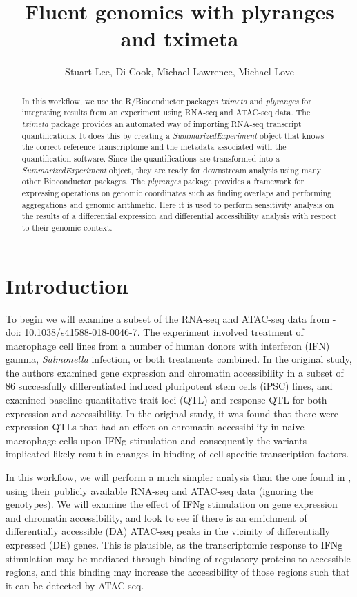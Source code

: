 \documentclass[
  9pt,
  a4paper,
]{extarticle}
\title{Fluent genomics with plyranges and tximeta}
\author{Stuart Lee, Di Cook, Michael Lawrence, Michael Love}
\date{}
\begin{document}
\maketitle
\begin{abstract}
In this workflow, we use the R/Bioconductor packages \emph{tximeta} and \emph{plyranges} for integrating results from an experiment using RNA-seq and ATAC-seq data. The \emph{tximeta} package provides an automated way of importing RNA-seq transcript quantifications. It does this by creating a \emph{SummarizedExperiment} object that knows the correct reference transcriptome and the metadata associated with the quantification software. Since the quantifications are transformed into a \emph{SummarizedExperiment} object, they are ready for downstream analysis using many other Bioconductor packages. The \emph{plyranges} package provides a framework for expressing operations on genomic coordinates such as finding overlaps and performing aggregations and genomic arithmetic. Here it is used to perform sensitivity analysis on the results of a differential expression and differential accessibility analysis with respect to their genomic context.
\end{abstract}

\hypertarget{introduction}{%
\section{Introduction}\label{introduction}}

To begin we will examine a subset of the RNA-seq and ATAC-seq data from \citet{alasoo}
- \href{https://doi.org/10.1038/s41588-018-0046-7}{doi: 10.1038/s41588-018-0046-7}.
The experiment involved treatment of macrophage cell lines from a number of
human donors with interferon (IFN) gamma, \emph{Salmonella} infection, or both
treatments combined. In the original study, the authors examined gene
expression and chromatin accessibility in a subset of 86 successfully
differentiated induced pluripotent stem cells (iPSC) lines, and examined
baseline quantitative trait loci (QTL) and response QTL for both expression and
accessibility. In the original study, it was found that there were expression
QTLs that had an effect on chromatin accessibility in naive macrophage cells
upon IFNg stimulation and consequently the variants implicated likely result in
changes in binding of cell-specific transcription factors.

In this workflow, we will perform a much simpler analysis than the one found in
\citet{alasoo}, using their publicly available RNA-seq and ATAC-seq data (ignoring the
genotypes). We will examine the effect of IFNg stimulation on gene expression
and chromatin accessibility, and look to see if there is an enrichment of
differentially accessible (DA) ATAC-seq peaks in the vicinity of differentially
expressed (DE) genes. This is plausible, as the transcriptomic response to IFNg
stimulation may be mediated through binding of regulatory proteins to
accessible regions, and this binding may increase the accessibility of those
regions such that it can be detected by ATAC-seq.
\end{document}
